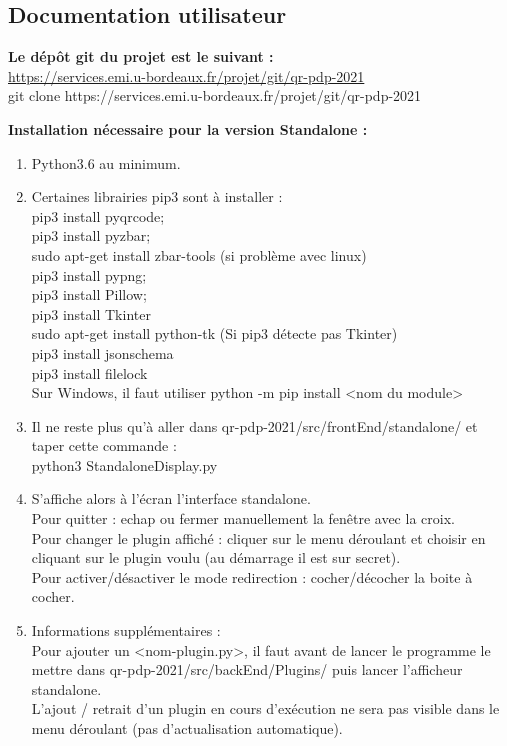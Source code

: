 \documentclass[a4paper,12pt]{article}
\begin{document}
\subsection{Documentation utilisateur}
\begin{flushleft}

\textbf{Le dépôt git du projet est le suivant :}\\
\url{https://services.emi.u-bordeaux.fr/projet/git/qr-pdp-2021}\\
git clone https://services.emi.u-bordeaux.fr/projet/git/qr-pdp-2021\\
\end{flushleft}
\begin{flushleft}
\textbf{Installation nécessaire pour la version Standalone :}\\

\begin{enumerate}
    \item Python3.6 au minimum.
    \item Certaines librairies pip3 sont à installer :\\
    pip3 install pyqrcode;\\
    pip3 install pyzbar;\\
    sudo apt-get install zbar-tools (si problème avec linux)\\
    pip3 install pypng;\\
    pip3 install Pillow;\\
    pip3 install Tkinter\\
    sudo apt-get install python-tk (Si pip3 détecte pas Tkinter)\\
    pip3 install jsonschema\\
    pip3 install filelock\\
    
    Sur Windows, il faut utiliser python -m pip install <nom du module>
    \item Il ne reste plus qu'à aller dans qr-pdp-2021/src/frontEnd/standalone/ et taper cette commande :\\
    python3 StandaloneDisplay.py\\
    \item S'affiche alors à l'écran l'interface standalone.\\
    Pour quitter : echap ou fermer manuellement la fenêtre avec la croix.\\
    Pour changer le plugin affiché : cliquer sur le menu déroulant et choisir en cliquant sur le plugin voulu (au démarrage il est sur secret).\\
    Pour activer/désactiver le mode redirection : cocher/décocher la boite à cocher.\\
    \item Informations supplémentaires :\\
    Pour ajouter un <nom-plugin.py>, il faut avant de lancer le programme le mettre dans qr-pdp-2021/src/backEnd/Plugins/
    puis lancer l'afficheur standalone.\\
    L'ajout / retrait d'un plugin en cours d'exécution ne sera pas visible dans le menu déroulant (pas d'actualisation automatique).\\


\end{enumerate}
\end{flushleft}
\end{document}
